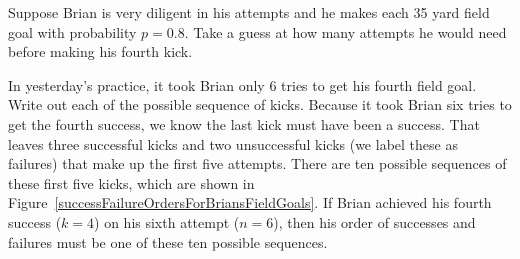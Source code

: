 \begin{exercisewrap}
\begin{nexercise}
Suppose Brian is very diligent in his attempts and he makes each 35 yard field goal with probability $p=0.8$. Take a guess at how many attempts he would need before making his fourth kick.\footnotemark
\end{nexercise}
\end{exercisewrap}

\begin{examplewrap}
\begin{nexample}{In yesterday's practice, it took Brian only 6 tries to get his fourth field goal. Write out each of the possible sequence of kicks.} \label{eachSeqOfSixTriesToGetFourSuccesses}
Because it took Brian six tries to get the fourth success, we know the last kick must have been a success. That leaves three successful kicks and two unsuccessful kicks (we label these as failures) that make up the first five attempts. There are ten possible sequences of these first five kicks, which are shown in Figure~\ref{successFailureOrdersForBriansFieldGoals}. If Brian achieved his fourth success ($k=4$) on his sixth attempt ($n=6$), then his order of successes and failures must be one of these ten possible sequences.
\end{nexample}
\end{examplewrap}

